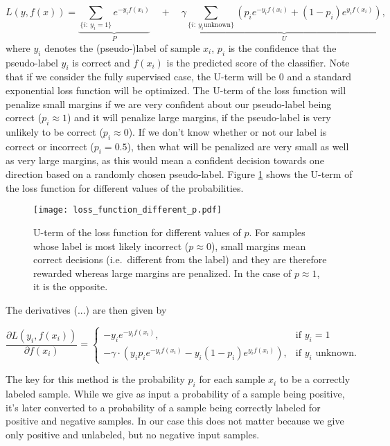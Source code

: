 \begin{equation*}
L(y,f(x)) = \underbrace{\sum_{\{i :~ y_i = 1\}} e^{-y_i f(x_i)}}_{P} \quad + \quad \gamma\underbrace{\sum_{\{i:~ y_i \text{unknown}\}} \left( p_i e^{-y_i f(x_i)} + (1-p_i) e^{y_i f(x_i)}\right)}_{U}, 
\end{equation*}
where $y_i$ denotes the (pseudo-)label of sample $x_i$, $p_i$ is the confidence that the pseudo-label $y_i$ is correct and $f(x_i)$ is the predicted score of the classifier.
Note that if we consider the fully supervised case, the U-term will be 0 and a standard exponential loss function will be optimized. 
The U-term of the loss function will penalize small margins if we are very confident about our pseudo-label being correct ($p_i \approx 1$) and it will penalize large margins, if the pseudo-label is very unlikely to be correct ($p_i \approx 0$). 
If we don't know whether or not our label is correct or incorrect ($p_i = 0.5$), then what will be penalized are very small as well as very large margins, as this would mean a confident decision towards one direction based on a randomly chosen pseudo-label. Figure \ref{fig:ourlossfunctionplot} shows the U-term of the loss function for different values of the probabilities.

\begin{figure}[ht]
  \centering
  \texttt{[image: loss\_function\_different\_p.pdf]}	
  \caption{U-term of the loss function for different values of $p$. For samples whose label is most likely incorrect ($p \approx 0$), small margins mean correct decisions (i.e.\ different from the label) and they are therefore rewarded whereas large margins are penalized. In the case of $p \approx 1$, it is the opposite.}
  \label{fig:ourlossfunctionplot}
\end{figure}

The derivatives (...)  are then given by 

\begin{equation*}
 \frac{\partial L(y_i,f(x_i))}{\partial f(x_i)} = 
    \begin{cases}
	-y_i e^{-y_i f(x_i)}, & \text{if $y_i = 1$}\\
	-\gamma \cdot \left(y_i p_i e^{-y_i f(x_i)} - y_i (1 - p_i) e^{y_i f(x_i)} \right), & \text{if $y_i$ unknown.}
      \end{cases}
\end{equation*}

The key for this method is the probability $p_i$ for each sample $x_i$ to be a correctly labeled sample. While we give as input a probability of a sample being positive, it's later converted to a probability of a sample being correctly labeled for positive and negative samples.  In our case this does not matter because we give only positive and unlabeled, but no negative input samples.

